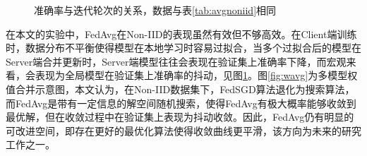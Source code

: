 \documentclass[zihao = -4,cn]{oucart}
\begin{document}
\begin{figure} 
	
	\centering 
	\caption{\label{fig:curve}准确率与迭代轮次的关系，数据与表\ref{tab:avgnoniid}相同} 
\end{figure}


在本文的实验中，FedAvg在Non-IID的表现虽然有效但不够高效。在Client端训练时，数据分布不平衡使得模型在本地学习时容易过拟合，当多个过拟合后的模型在Server端合并更新时，Server端模型往往会表现在验证集上准确率下降，而宏观来看，会表现为全局模型在验证集上准确率的抖动，见图\ref{fig:curve}。图\ref{fig:wavg}为多模型权值合并示意图，本文认为，在Non-IID数据集下，FedSGD算法退化为搜索算法，而FedAvg是带有一定信息的解空间随机搜索，使得FedAvg有极大概率能够收敛到最优解，但在收敛过程中在验证集上表现为抖动收敛。因此，FedAvg仍有明显的可改进空间，即存在更好的最优化算法使得收敛曲线更平滑，该方向为未来的研究工作之一。\par
\end{document}
